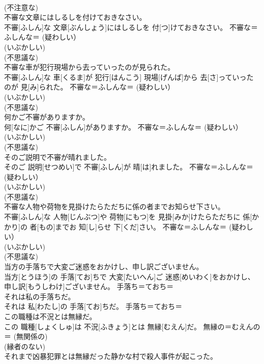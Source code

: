 \documentclass[8pt]{extreport}
\begin{document}
\begin{CJK}{UTF8}{min}
{\\	(不注意な) 
\\	不審な文章にはしるしを付けておきなさい。	
\\	不審[ふしん]な 文章[ぶんしょう]にはしるしを 付[つ]けておきなさい。	不審な＝ふしんな＝ (疑わしい）
\\	(いぶかしい) 
\\	(不思議な) 
\\	不審な車が犯行現場から去っていったのが見られた。	
\\	不審[ふしん]な 車[くるま]が 犯行[はんこう] 現場[げんば]から 去[さ]っていったのが 見[み]られた。	不審な＝ふしんな＝ (疑わしい）
\\	(いぶかしい) 
\\	(不思議な) 
\\	何かご不審がありますか。	
\\	何[なに]かご 不審[ふしん]がありますか。	不審な＝ふしんな＝ (疑わしい）
\\	(いぶかしい) 
\\	(不思議な) 
\\	そのご説明で不審が晴れました。	
\\	そのご 説明[せつめい]で 不審[ふしん]が 晴[は]れました。	不審な＝ふしんな＝ (疑わしい）
\\	(いぶかしい) 
\\	(不思議な) 
\\	不審な人物や荷物を見掛けたらただちに係の者までお知らせ下さい。	
\\	不審[ふしん]な 人物[じんぶつ]や 荷物[にもつ]を 見掛[みか]けたらただちに 係[かかり]の 者[もの]までお 知[し]らせ 下[くだ]さい。	不審な＝ふしんな＝ (疑わしい）
\\	(いぶかしい) 
\\	(不思議な) 
\\	当方の手落ちで大変ご迷惑をおかけし、申し訳ございません。	
\\	当方[とうほう]の 手落[てお]ちで 大変[たいへん]ご 迷惑[めいわく]をおかけし、 申し訳[もうしわけ]ございません。	手落ち＝ておち＝ 
\\	それは私の手落ちだ。	
\\	それは 私[わたし]の 手落[てお]ちだ。	手落ち＝ておち＝ 
\\	この職種は不況とは無縁だ。	
\\	この 職種[しょくしゅ]は 不況[ふきょう]とは 無縁[むえん]だ。	無縁の＝むえんの＝ (無関係の) 
\\	(縁者のない) 
\\	それまで凶暴犯罪とは無縁だった静かな村で殺人事件が起こった。	
}
\end{CJK}
\end{document}
